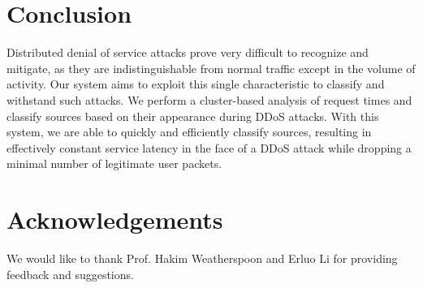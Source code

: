 \documentclass[twocolumn]{article}
\begin{document}
\section{Conclusion}

Distributed denial of service attacks prove very difficult to recognize and mitigate, as they are indistinguishable from normal traffic except in the volume of activity. Our system aims to exploit this single characteristic to classify and withstand such attacks.   We perform a cluster-based analysis of request times and classify sources based on their appearance during DDoS attacks. With this system, we are able to quickly and efficiently classify sources, resulting in effectively constant service latency in the face of a DDoS attack while dropping a minimal number of legitimate user packets.

\section{Acknowledgements}

We would like to thank Prof. Hakim Weatherspoon and Erluo Li for providing feedback and suggestions.

{}

\end{document}
